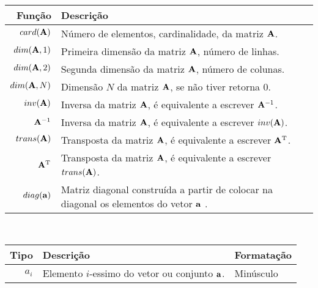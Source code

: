 \begin{notation}~\\
\begin{tabular}{r |  p{.7\linewidth} }
\hline	
Função & Descrição \\ \hline
$card(\MATRIX{A})$ & Número de elementos, cardinalidade, da matriz $\MATRIX{A}$. \\
\hline
$dim(\MATRIX{A},1)$ & Primeira dimensão da matriz $\MATRIX{A}$, número de linhas. \\
$dim(\MATRIX{A},2)$ & Segunda dimensão da matriz $\MATRIX{A}$, número de colunas. \\
$dim(\MATRIX{A},N)$ & Dimensão $N$ da matriz $\MATRIX{A}$, se não tiver retorna $0$. \\
\hline
$\funcinv(\MATRIX{A})$ & Inversa da matriz $\MATRIX{A}$, é equivalente a escrever $\MATRIX{A}^{-1}$. \\
$\MATRIX{A}^{-1}$ & Inversa da matriz $\MATRIX{A}$, é equivalente a escrever $\funcinv(\MATRIX{A})$. \\
\hline
$\functrans(\MATRIX{A})$ & Transposta da matriz $\MATRIX{A}$, é equivalente a escrever $\MATRIX{A}^{\transpose}$. \\
$\MATRIX{A}^{\transpose}$ & Transposta da matriz $\MATRIX{A}$, é equivalente a escrever $trans(\MATRIX{A})$. \\
\hline
$\funcdiag(\VECTOR{a})$ & Matriz diagonal construída a partir de colocar na diagonal os elementos do vetor $\VECTOR{a}$ . \\
\end{tabular}
\end{notation}

\newpage
\begin{notation}~\\
\begin{tabular}{r | p{.6\linewidth} | l}
\hline	
Tipo & Descrição & Formatação \\ \hline
$a_{i}$ & Elemento $i$-essimo do vetor ou conjunto  $\VECTOR{a}$.& Minúsculo \\
\end{tabular}
\end{notation}


